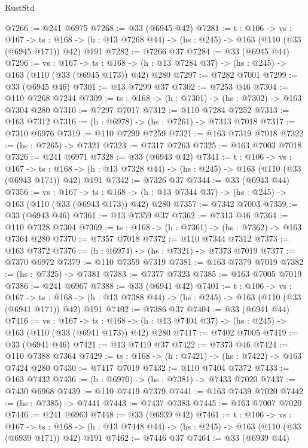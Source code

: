 \begin{lexlean}{RustStd}
\begin{coremodule}
@7266 := @241 @6975
@7268 := @33 (@6945 @42)
@7281 := {t : @106} ->
  {vs : @167} ->
  {ts : @168} -> (h : @13 @7268 @44) -> (hs : @245) -> @163 (@110 (@33 (@6945 @171)) @42) @191
@7282 := @7266 @37
@7284 := @33 (@6945 @44)
@7296 := {vs : @167} ->
  {ts : @168} -> (h : @13 @7284 @37) -> (hs : @245) -> @163 (@110 (@33 (@6945 @173)) @42) @280
@7297 := @7282 @7001
@7299 := @33 (@6945 @46)
@7301 := @13 @7299 @37
@7302 := @7253 @46
@7304 := @110 @7268 @7244
@7309 := {ts : @168} -> (h : @7301) -> (hs : @7302) -> @163 @7304 @280
@7310 := @7297 @7017
@7312 := @110 @7284 @7252
@7313 := @163 @7312
@7316 := (h : @6978) -> (hs : @7261) -> @7313 @7018
@7317 := @7310 @6976
@7319 := @110 @7299 @7259
@7321 := @163 @7319 @7018
@7322 := (hs : @7265) -> @7321
@7323 := @7317 @7263
@7325 := @163 @7003 @7018
@7326 := @241 @6971
@7328 := @33 (@6943 @42)
@7341 := {t : @106} ->
  {vs : @167} ->
  {ts : @168} -> (h : @13 @7328 @44) -> (hs : @245) -> @163 (@110 (@33 (@6943 @171)) @42) @191
@7342 := @7326 @37
@7344 := @33 (@6943 @44)
@7356 := {vs : @167} ->
  {ts : @168} -> (h : @13 @7344 @37) -> (hs : @245) -> @163 (@110 (@33 (@6943 @173)) @42) @280
@7357 := @7342 @7003
@7359 := @33 (@6943 @46)
@7361 := @13 @7359 @37
@7362 := @7313 @46
@7364 := @110 @7328 @7304
@7369 := {ts : @168} -> (h : @7361) -> (hs : @7362) -> @163 @7364 @280
@7370 := @7357 @7018
@7372 := @110 @7344 @7312
@7373 := @163 @7372
@7376 := (h : @6974) -> (hs : @7321) -> @7373 @7019
@7377 := @7370 @6972
@7379 := @110 @7359 @7319
@7381 := @163 @7379 @7019
@7382 := (hs : @7325) -> @7381
@7383 := @7377 @7323
@7385 := @163 @7005 @7019
@7386 := @241 @6967
@7388 := @33 (@6941 @42)
@7401 := {t : @106} ->
  {vs : @167} ->
  {ts : @168} -> (h : @13 @7388 @44) -> (hs : @245) -> @163 (@110 (@33 (@6941 @171)) @42) @191
@7402 := @7386 @37
@7404 := @33 (@6941 @44)
@7416 := {vs : @167} ->
  {ts : @168} -> (h : @13 @7404 @37) -> (hs : @245) -> @163 (@110 (@33 (@6941 @173)) @42) @280
@7417 := @7402 @7005
@7419 := @33 (@6941 @46)
@7421 := @13 @7419 @37
@7422 := @7373 @46
@7424 := @110 @7388 @7364
@7429 := {ts : @168} -> (h : @7421) -> (hs : @7422) -> @163 @7424 @280
@7430 := @7417 @7019
@7432 := @110 @7404 @7372
@7433 := @163 @7432
@7436 := (h : @6970) -> (hs : @7381) -> @7433 @7020
@7437 := @7430 @6968
@7439 := @110 @7419 @7379
@7441 := @163 @7439 @7020
@7442 := (hs : @7385) -> @7441
@7443 := @7437 @7383
@7445 := @163 @7007 @7020
@7446 := @241 @6963
@7448 := @33 (@6939 @42)
@7461 := {t : @106} ->
  {vs : @167} ->
  {ts : @168} -> (h : @13 @7448 @44) -> (hs : @245) -> @163 (@110 (@33 (@6939 @171)) @42) @191
@7462 := @7446 @37
@7464 := @33 (@6939 @44)

\end{coremodule}
\end{lexlean}
